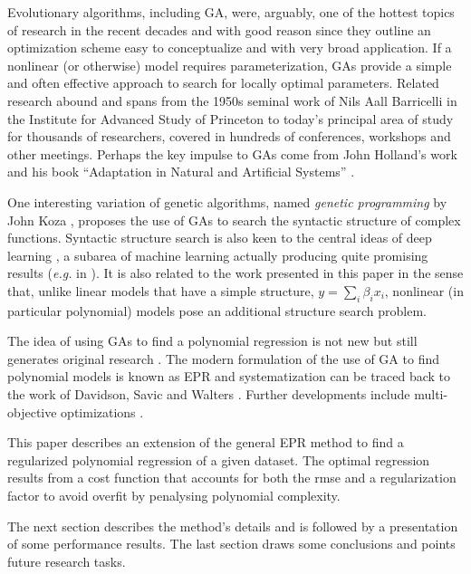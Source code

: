 \documentclass[times,review,preprint]{elsarticle}
\begin{document}
Evolutionary algorithms, including \ac{GA}, were, arguably, one of the hottest topics of research in the recent decades and with good reason since they outline an optimization scheme easy to conceptualize and with very broad application. If a nonlinear (or otherwise) model requires parameterization, \acp{GA} provide a simple and often effective approach to search for locally optimal parameters. Related research abound and spans from the 1950s seminal work of Nils Aall Barricelli \citep{Barricelli:1962aa} in the Institute for Advanced Study of Princeton to today's principal area of study for thousands of researchers, covered in hundreds of conferences, workshops and other meetings. Perhaps the key impulse to \acp{GA} come from John Holland's work and his book ``Adaptation in Natural and Artificial Systems'' \citep{Holland:1975aa}. 

One interesting variation of genetic algorithms, named \emph{genetic programming} by John Koza \citep{Koza:1992aa}, proposes the use of \acp{GA} to search the syntactic structure of complex functions. Syntactic structure search is also keen to the central ideas of deep learning \citep{Bengio:2009aa,Bengio:2013aa}, a subarea of machine learning actually producing quite promising results (\emph{e.g.} in \cite{Tarlow:2013fk}). It is also related to the work presented in this paper in the sense that, unlike linear models that have a simple structure, $y=\sum_i \beta_i x_i$, nonlinear (in particular polynomial) models pose an additional structure search problem.

The idea of using \acp{GA} to find a polynomial regression is not new \citep{Maertens:2006aa, Yu:2008aa, Wu:2009aa} but still generates original research \citep{Hofwing:2011aa,Cetisli:2011aa}. The modern formulation of the use of \ac{GA} to find polynomial models is known as \acf{EPR} and systematization can be traced back to the work of Davidson, Savic and Walters \cite{Davidson:2003aa}. Further developments include multi-objective optimizations \cite{Giustolisi:2009aa}. 

This paper describes an extension of the general \ac{EPR} method to find a regularized polynomial regression of a given dataset. The optimal regression results from a cost function that accounts for both the \ac{rmse} and a regularization factor to avoid overfit by penalysing polynomial complexity.

The next section describes the method's details and is followed by a presentation of some performance results. The last section draws some conclusions and points future research tasks.
\end{document}
